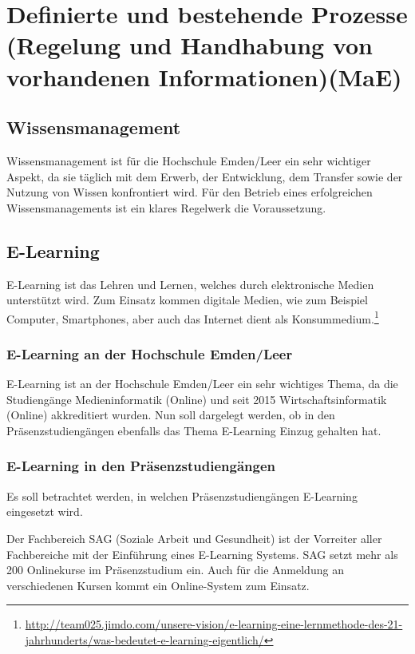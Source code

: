 \section{Definierte und bestehende Prozesse (Regelung und Handhabung von vorhandenen Informationen)(MaE)}

\subsection{Wissensmanagement}
Wissensmanagement ist für die Hochschule Emden/Leer ein sehr wichtiger Aspekt, da sie täglich mit dem Erwerb, der Entwicklung, dem Transfer sowie der Nutzung von Wissen konfrontiert wird. Für den Betrieb eines erfolgreichen Wissensmanagements ist ein klares Regelwerk die Voraussetzung.

\subsection{E-Learning}
E-Learning ist das Lehren und Lernen, welches durch elektronische Medien unterstützt wird. Zum Einsatz kommen digitale Medien, wie zum Beispiel Computer, Smartphones, aber auch das Internet dient als Konsummedium.\footnote{\url{http://team025.jimdo.com/unsere-vision/e-learning-eine-lernmethode-des-21-jahrhunderts/was-bedeutet-e-learning-eigentlich/}}

\subsubsection{E-Learning an der Hochschule Emden/Leer}
E-Learning ist an der Hochschule Emden/Leer ein sehr wichtiges Thema, da die Studiengänge Medieninformatik (Online) und seit 2015 Wirtschaftsinformatik (Online) akkreditiert  wurden. Nun soll dargelegt werden, ob in den Präsenzstudiengängen ebenfalls das Thema E-Learning Einzug gehalten hat.

\subsubsection{E-Learning in den Präsenzstudiengängen}
Es soll betrachtet werden, in welchen Präsenzstudiengängen E-Learning eingesetzt wird.

Der Fachbereich SAG (Soziale Arbeit und Gesundheit) ist der Vorreiter aller Fachbereiche mit der Einführung eines E-Learning Systems. SAG setzt mehr als 200 Onlinekurse im Präsenzstudium ein. Auch für die Anmeldung an verschiedenen Kursen kommt ein Online-System zum Einsatz.

